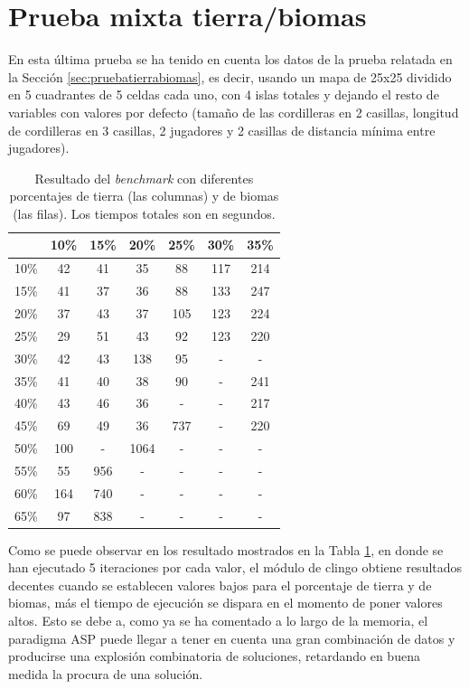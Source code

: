 \section{Prueba mixta tierra/biomas}
\label{sec:pruebafinal}

En esta última prueba se ha tenido en cuenta los datos de la prueba relatada en la Sección \ref{sec:pruebatierrabiomas}, es decir, usando un mapa de 25x25 dividido en 5 cuadrantes de 5 celdas cada uno, con 4 islas totales y dejando el resto de variables con valores por defecto (tamaño de las cordilleras en 2 casillas, longitud de cordilleras en 3 casillas, 2 jugadores y 2 casillas de distancia mínima entre jugadores).

\begin{table}[!h]
	\centering
	\begin{tabular}{c|cccccc}
	 & 10\% & 15\% & 20\% & 25\% & 30\% & 35\% \\
	\hline
	10\% & 42 & 41 & 35 & 88 & 117 & 214 \\
	15\% & 41 & 37 & 36 & 88 & 133 & 247 \\
	20\% & 37 & 43 & 37 & 105 & 123 & 224 \\
	25\% & 29 & 51 & 43 & 92 & 123 & 220 \\
	30\% & 42 & 43 & 138 & 95 & - & - \\
	35\% & 41 & 40 & 38 & 90 & - & 241 \\
	40\% & 43 & 46 & 36 & -  & - & 217  \\
	45\% & 69 & 49 & 36 & 737 & - & 220 \\
	50\% & 100 & - & 1064 & - & - & - \\
	55\% & 55 & 956 & - & - & - & - \\
	60\% & 164 & 740 & - & - & - & - \\
	65\% & 97 & 838 & - & - & - & - \\
	\hline
	\end{tabular}
	\caption{Resultado del \textit{benchmark} con diferentes porcentajes de tierra (las columnas) y de biomas (las filas). Los tiempos totales son en segundos.}\label{table:finalresult}
\end{table}

Como se puede observar en los resultado mostrados en la Tabla \ref{table:finalresult}, en donde se han ejecutado 5 iteraciones por cada valor, el módulo de clingo obtiene resultados decentes cuando se establecen valores bajos para el porcentaje de tierra y de biomas, más el tiempo de ejecución se dispara en el momento de poner valores altos. Esto se debe a, como ya se ha comentado a lo largo de la memoria, el paradigma ASP puede llegar a tener en cuenta una gran combinación de datos y producirse una explosión combinatoria de soluciones, retardando en buena medida la procura de una solución.
